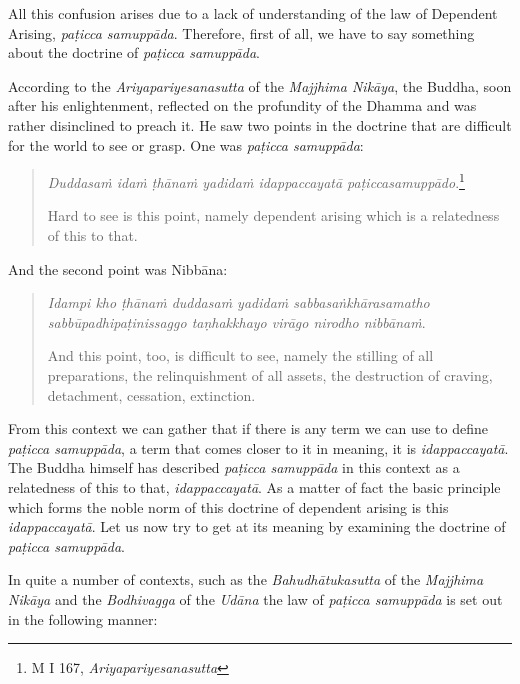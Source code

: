 All this confusion arises due to a lack of understanding of the law of Dependent Arising, \emph{paṭicca samuppāda}. Therefore, first of all, we have to say something about the doctrine of \emph{paṭicca samuppāda}.

According to the \emph{Ariyapariyesanasutta} of the \emph{Majjhima Nikāya}, the Buddha, soon after his enlightenment, reflected on the profundity of the Dhamma and was rather disinclined to preach it. He saw two points in the doctrine that are difficult for the world to see or grasp. One was \emph{paṭicca samuppāda}:

\begin{quote}
\emph{Duddasaṁ idaṁ ṭhānaṁ yadidaṁ idappaccayatā paṭiccasamuppādo}.\footnote{M I 167, \emph{Ariyapariyesanasutta}}

Hard to see is this point, namely dependent arising which is a relatedness of this to that.
\end{quote}

And the second point was Nibbāna:

\begin{quote}
\emph{Idampi kho ṭhānaṁ duddasaṁ yadidaṁ sabbasaṅkhārasamatho sabbūpadhipaṭinissaggo taṇhakkhayo virāgo nirodho nibbānaṁ}.

And this point, too, is difficult to see, namely the stilling of all preparations, the relinquishment of all assets, the destruction of craving, detachment, cessation, extinction.
\end{quote}

From this context we can gather that if there is any term we can use to define \emph{paṭicca samuppāda}, a term that comes closer to it in meaning, it is \emph{idappaccayatā}. The Buddha himself has described \emph{paṭicca samuppāda} in this context as a relatedness of this to that, \emph{idappaccayatā}. As a matter of fact the basic principle which forms the noble norm of this doctrine of dependent arising is this \emph{idappaccayatā}. Let us now try to get at its meaning by examining the doctrine of \emph{paṭicca samuppāda}.

In quite a number of contexts, such as the \emph{Bahudhātukasutta} of the \emph{Majjhima Nikāya} and the \emph{Bodhivagga} of the \emph{Udāna} the law of \emph{paṭicca samuppāda} is set out in the following manner:

